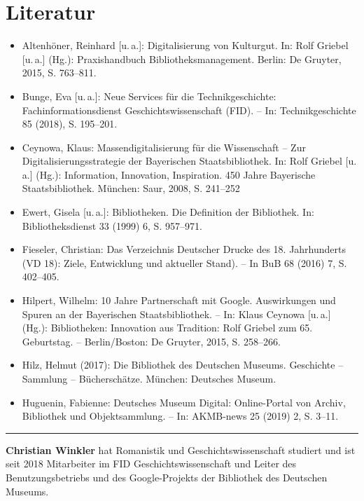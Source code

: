 \documentclass[a4paper,
fontsize=11pt,
oneside,
numbers=noperiodatend,
parskip=half-,
bibliography=totoc,
final
]{scrartcl}
\begin{document}
\hypertarget{literatur}{%
\section{Literatur}\label{literatur}}

\begin{itemize}
\item
  Altenhöner, Reinhard {[}u.\,a.{]}: Digitalisierung von Kulturgut. In:
   Rolf Griebel {[}u.\,a.{]} (Hg.): Praxishandbuch
  Bibliotheksmanagement.  Berlin: De Gruyter, 2015, S.
  763--811.
\item
  Bunge, Eva {[}u.\,a.{]}: Neue Services für die Technikgeschichte:
   Fachinformationsdienst Geschichtswissenschaft (FID). --
  In:  Technikgeschichte 85 (2018), S. 195--201.
\item
  Ceynowa, Klaus: Massendigitalisierung für die Wissenschaft -- Zur
   Digitalisierungsstrategie der Bayerischen
  Staatsbibliothek. In:  Rolf Griebel {[}u.\,a.{]} (Hg.):
  Information, Innovation, Inspiration.  450 Jahre
  Bayerische Staatsbibliothek. München: Saur, 2008, S. 
  241--252
\item
  Ewert, Gisela {[}u.\,a.{]}: Bibliotheken. Die Definition der Bibliothek.
   In: Bibliotheksdienst 33 (1999) 6, S. 957--971.
\item
  Fieseler, Christian: Das Verzeichnis Deutscher Drucke des 18.
   Jahrhunderts (VD 18): Ziele, Entwicklung und aktueller
  Stand). --  In BuB 68 (2016) 7, S. 402--405.
\item
  Hilpert, Wilhelm: 10 Jahre Partnerschaft mit Google. Auswirkungen
   und Spuren an der Bayerischen Staatsbibliothek. -- In:
  Klaus  Ceynowa {[}u.\,a.{]} (Hg.): Bibliotheken:
  Innovation aus Tradition:  Rolf Griebel zum 65.
  Geburtstag. -- Berlin/Boston: De Gruyter,  2015, S.
  258--266.
\item
  Hilz, Helmut (2017): Die Bibliothek des Deutschen Museums.
   Geschichte -- Sammlung -- Bücherschätze. München:
  Deutsches  Museum.
\item
  Huguenin, Fabienne: Deutsches Museum Digital: Online-Portal von
   Archiv, Bibliothek und Objektsammlung. -- In: AKMB-news
  25 (2019)  2, S. 3--11.
\end{itemize}

\begin{center}\rule{0.5\linewidth}{0.5pt}\end{center}

\textbf{Christian Winkler} hat Romanistik und Geschichtswissenschaft
studiert und ist seit 2018 Mitarbeiter im FID Geschichtswissenschaft und
Leiter des Benutzungsbetriebs und des Google-Projekts der Bibliothek des
Deutschen Museums.
\end{document}
